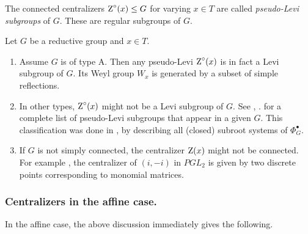 \begin{notation}
The connected centralizers $\operatorname{Z}^{\circ}(x) \leq G$ for varying $x\in T$ are called \emph{pseudo-Levi subgroups} of $G$. These are regular subgroups of $G$.
\end{notation}


\begin{remark}
Let $G$ be a reductive group and $x \in T$.
\begin{enumerate}
\item[(1)] Assume $G$ is of type A. Then any pseudo-Levi $\operatorname{Z}^{\circ}(x)$ is in fact a Levi subgroup of $G$. Its Weyl group $W_x$ is generated by a subset of simple reflections.
%
\item[(2)] In other types, $\operatorname{Z}^{\circ}(x)$ might not be a Levi subgroup of $G$. See \cite[Table 1]{RV19}, \cite[\S 12.1]{Kan01}. for a complete list of pseudo-Levi subgroups that appear in a given $G$.
%
This classification was done in \cite{BD49}, by describing all (closed) subroot systems of $\Phi^{\bullet}_G$.
%
\item[(3)] If $G$ is not simply connected, the centralizer $\operatorname{Z}(x)$ might not be connected. For example \cite[4.3.Examples]{SS70}, the centralizer of $(i, -i)$ in $PGL_2$ is given by two discrete points corresponding to monomial matrices.
\end{enumerate}  
\end{remark}


\subsubsection{Centralizers in the affine case.}\label{section: centralizers in the affine case}
In the affine case, the above discussion immediately gives the following.

